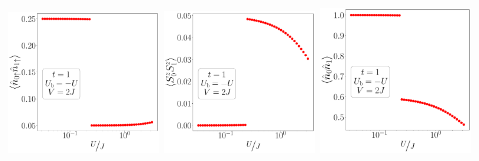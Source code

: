 \documentclass{report}
\numberwithin{equation}{section}
\begin{document}
\begin{center}
	\includegraphics[width=0.3\textwidth]{../figures/r-par-t=1.000,J=31.623,0.000,50,V=2J,Ubath=-U,N=4,U=0.032,3.162,50.pdf}
	\includegraphics[width=0.3\textwidth]{../figures/r-ising-t=1.000,J=31.623,0.000,50,V=2J,Ubath=-U,N=4,U=0.032,3.162,50.pdf}
	\includegraphics[width=0.3\textwidth]{../figures/r-charge-t=1.000,J=31.623,0.000,50,V=2J,Ubath=-U,N=4,U=0.032,3.162,50.pdf}
\end{center}
\end{document}
